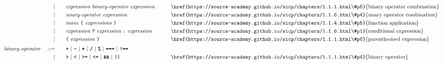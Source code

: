 \begin{alignat*}{9}
&&                       && |   &\quad &&  \textit{expression} \  \textit{binary-operator} \ 
                                            \textit{expression} \qquad
                                                           && \textrm{\href{https://source-academy.github.io/sicp/chapters/1.1.1.html\#p5}{binary operator combination}}\\
&&                       && |   &\quad &&   \textit{unary-operator} \ 
                                            \textit{expression}
                                                           && \textrm{\href{https://source-academy.github.io/sicp/chapters/1.1.6.html\#p4}{unary operator combination}}\\
&&                       && |   &\quad &&   \textit{name} \ 
                                            \textbf{\texttt{(}}\ \textit{expressions}\
                                            \textbf{\texttt{)}}
                                                           && \textrm{\href{https://source-academy.github.io/sicp/chapters/1.1.4.html\#p5}{function application}}\\
&&                       && |   &\quad &&   \textit{expression} \ \textbf{\texttt{?}}\ 
                                            \textit{expression}
                                            \ \textbf{\texttt{:}}\
                                            \textit{expression}\
                                                           && \textrm{\href{https://source-academy.github.io/sicp/chapters/1.1.6.html\#p1}{conditional expression}}\\
&&                       && |   &\quad &&  \textbf{\texttt{(}}\  \textit{expression} \ 
                                            \textbf{\texttt{)}} && \textrm{\href{https://source-academy.github.io/sicp/chapters/1.1.1.html\#p6}{parenthesised expression}}\\[1mm]
&& \textit{binary-operator}    \ 
                        && ::= &\quad && \textbf{\texttt{+}}\ |\ \textbf{\texttt{-}}\ |\ \textbf{\texttt{*}}\ |\ \textbf{\texttt{/}}\ |\ \textbf{\texttt{\%}}\ |\ 
                                   \textbf{\texttt{===}}\ |\ \textbf{\texttt{!==}}\ \\
&&                       && |  &\quad &&  \texttt{\textbf{>}}\ |\ \texttt{\textbf{<}}\ |\ \texttt{\textbf{>=}}\ |\ \texttt{\textbf{<=}}\
                                          |\ \textbf{\texttt{\&\&}}\ |\ \texttt{\textbf{||}}
                                          && \textrm{\href{https://source-academy.github.io/sicp/chapters/1.1.1.html\#p4}{binary operator}}\\[1mm]

\end{alignat*}

